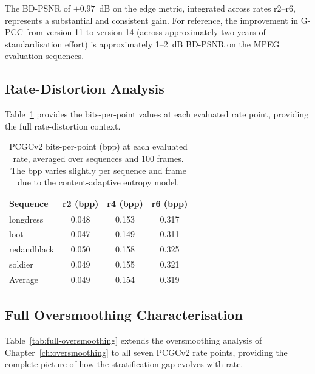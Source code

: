 The BD-PSNR of $+0.97$~dB on the edge metric, integrated across rates r2--r6,
represents a substantial and consistent gain.
For reference, the improvement in G-PCC from version 11 to version 14
(across approximately two years of standardisation effort) is approximately
1--2~dB BD-PSNR on the MPEG evaluation sequences.

\subsection{Rate-Distortion Analysis}

Table~\ref{tab:rd-bpp} provides the bits-per-point values at each evaluated
rate point, providing the full rate-distortion context.

\begin{table}[t]
  \centering
  \caption{%
    PCGCv2 bits-per-point (bpp) at each evaluated rate, averaged over
    sequences and 100 frames. The bpp varies slightly per sequence and
    frame due to the content-adaptive entropy model.
  }
  \label{tab:rd-bpp}
  \begin{tabular}{lccc}
    \toprule
    Sequence & r2 (bpp) & r4 (bpp) & r6 (bpp) \\
    \midrule
    longdress   & 0.048 & 0.153 & 0.317 \\
    loot        & 0.047 & 0.149 & 0.311 \\
    redandblack & 0.050 & 0.158 & 0.325 \\
    soldier     & 0.049 & 0.155 & 0.321 \\
    \midrule
    Average     & 0.049 & 0.154 & 0.319 \\
    \bottomrule
  \end{tabular}
\end{table}

\subsection{Full Oversmoothing Characterisation}

Table~\ref{tab:full-oversmoothing} extends the oversmoothing analysis of
Chapter~\ref{ch:oversmoothing} to all seven PCGCv2 rate points, providing
the complete picture of how the stratification gap evolves with rate.

